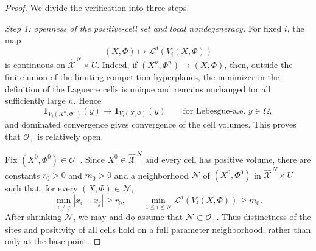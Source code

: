 \documentclass[11pt]{article}
\def\Nc{{\mathcal N}}
\def\Oc{{\mathcal O}}
\def\Xc{{\mathcal X}}
\def\id{\mathbf{1}}
\def\hX{\widehat{\Xc}^{\,N}}
\newcommand{\Leb}{\mathcal L}
\theoremstyle{definition}
\theoremstyle{remark}
\numberwithin{equation}{section}
\begin{document}
\begin{proof}
We divide the verification into three steps.

\smallskip
\noindent\textit{Step 1: openness of the positive-cell set and local nondegeneracy.}
For fixed $i$, the map
\[
 (X,\Phi)\longmapsto \Leb^d(V_i(X,\Phi))
\]
is continuous on $\hX\times U$.  Indeed, if $(X^n,\Phi^n)\to(X,\Phi)$, then, outside the finite
union of the limiting competition hyperplanes, the minimizer in the definition of the Laguerre
cells is unique and remains unchanged for all sufficiently large $n$.  Hence
\[
 \id_{V_i(X^n,\Phi^n)}(y)
 \longrightarrow
 \id_{V_i(X,\Phi)}(y)
 \qquad\text{for Lebesgue-a.e. }y\in\Omega,
\]
and dominated convergence gives convergence of the cell volumes.  This proves that $\Oc_+$ is
relatively open.

Fix $(X^0,\Phi^0)\in\Oc_+$.  Since $X^0\in\hX$ and every cell has positive volume, there are
constants $r_0>0$ and $m_0>0$ and a neighborhood $\Nc$ of $(X^0,\Phi^0)$ in $\hX\times U$ such
that, for every $(X,\Phi)\in\Nc$,
\begin{equation}\label{eq:local-positive-separated-app}
 \min_{i\ne j}|x_i-x_j|\ge r_0,
 \qquad
 \min_{1\le i\le N}\Leb^d(V_i(X,\Phi))\ge m_0.
\end{equation}
After shrinking $\Nc$, we may and do assume that $\Nc\subset\Oc_+$.  Thus distinctness of the
sites and positivity of all cells hold on a full parameter neighborhood, rather than only at the
base point.


\end{proof}
\end{document}

